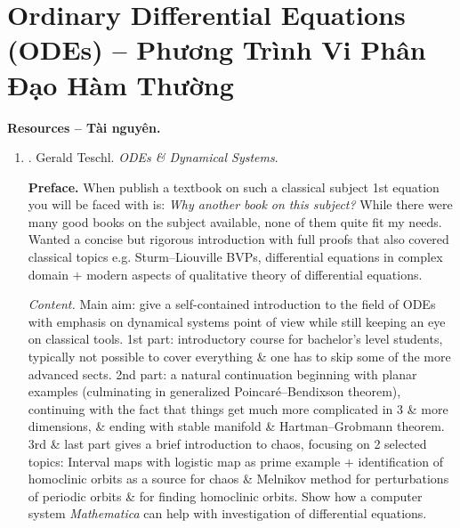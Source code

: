 \documentclass{article}
\begin{document}

\section{Ordinary Differential Equations (ODEs) -- Phương Trình Vi Phân Đạo Hàm Thường}
\textbf{\textsf{Resources -- Tài nguyên.}}
\begin{enumerate}
	\item \cite{Teschl2012}. {\sc Gerald Teschl}. {\it ODEs \& Dynamical Systems}.
	
	{\bf Preface.} When publish a textbook on such a classical subject 1st equation you will be faced with is: {\it Why another book on this subject?} While there were many good books on the subject available, none of them quite fit my needs. Wanted a concise but rigorous introduction with full proofs that also covered classical topics e.g. Sturm--Liouville BVPs, differential equations in complex domain $+$ modern aspects of qualitative theory of differential equations.
	
	{\it Content.} Main aim: give a self-contained introduction to the field of ODEs with emphasis on dynamical systems point of view while still keeping an eye on classical tools. 1st part: introductory course for bachelor's level students, typically not possible to cover everything \& one has to skip some of the more advanced sects. 2nd part: a natural continuation beginning with planar examples (culminating in generalized Poincar\'e--Bendixson theorem), continuing with the fact that things get much more complicated in 3 \& more dimensions, \& ending with stable manifold \& Hartman--Grobmann theorem. 3rd \& last part gives a brief introduction to chaos, focusing on 2 selected topics: Interval maps with logistic map as prime example $+$ identification of homoclinic orbits as a source for chaos \& Melnikov method for perturbations of periodic orbits \& for finding homoclinic orbits. Show how a computer system {\it Mathematica} can help with investigation of differential equations.
	

\end{enumerate}
\end{document}
